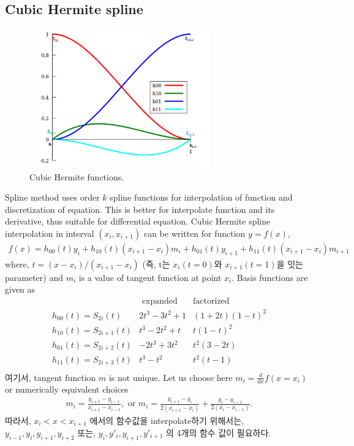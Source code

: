 \documentclass[10pt]{book}
\newcommand{\bea}{\begin{eqnarray}}
\newcommand{\eea}{\end{eqnarray}}
\begin{document}
\subsection{Cubic Hermite spline}
\begin{figure}[h!]
\begin{center}
\includegraphics[height=60mm]{CubicHermite1.png}
\end{center}
\caption{Cubic Hermite functions.}
\label{fig:spline}
\end{figure}
Spline method uses order $k$ spline functions for
interpolation of function and discretization
of equation. This is better for 
interpolate function and its derivative, thus
suitable for differential equation.
Cubic Hermite spline interpolation in interval $(x_i,x_{i+1})$
can be written for function $y=f(x)$, 
\bea
f(x)=h_{00}(t)y_i+h_{10}(t)(x_{i+1}-x_i)m_i
    +h_{01}(t)y_{i+1}+h_{11}(t)(x_{i+1}-x_i) m_{i+1} 
\eea 
where, $t=(x-x_i)/(x_{i+1}-x_i)$ (즉, t는 $x_i(t=0)$와 $x_{i+1}(t=1)$을 잇는
parameter) and 
$m_i$ is a value of tangent function at point $x_i$.
Basis functions are given as
\begin{equation}
\begin{array}{l|l|l}
           &\mbox{ expanded}& \mbox{factorized} \\
           \hline 
 h_{00}(t)=S_{2i}(t) & 2t^3-3t^2+1    & (1+2t)(1-t)^2     \\
 h_{10}(t)=S_{2i+1}(t) & t^3-2t^2+t     & t(1-t)^2          \\
 h_{01}(t)=S_{2i+2}(t) & -2t^3+3t^2     & t^2(3-2t)         \\
 h_{11}(t)=S_{2i+3}(t) & t^3-t^2        & t^2(t-1)\\
\end{array} 
\end{equation}
여기서, tangent function $m$ is not unique.
Let us choose here $m_i=\frac{d}{dx}f({x=x_i})$
or numerically equivalent choices
\bea
m_i=\frac{y_{i+1}-y_{i-1}}{x_{i+1}-x_{i-1}},\mbox{ or }
m_i=\frac{y_{i+1}-y_i}{2(x_{i+1}-x_i)}
   +\frac{y_{i}-y_{i-1}}{2(x_{i}-x_{i-1})}.
\eea
따라서, $x_i<x<x_{i+1}$ 에서의 함수값을 interpolate하기 위해서는,
$y_{i-1},y_{i},y_{i+1},y_{i+2}$ 또는,
$y_{i},y'_i,y_{i+1},y'_{i+1}$ 의 4개의 함수 값이 필요하다. 
\end{document}
